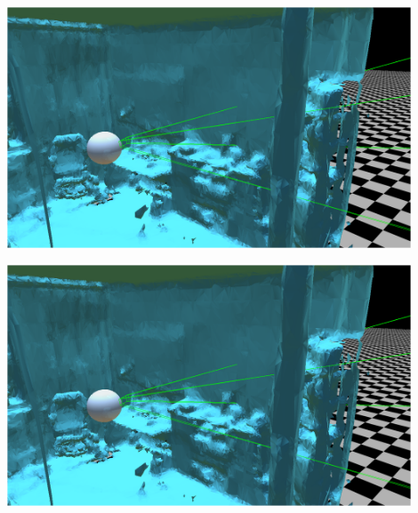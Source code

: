 \begin{minipage}{0.48\textwidth}
	\centering
	\includegraphics[width=0.9\textwidth]{images/Spatial_Understanding.png}
	\label{img:spatial-mapping}
\end{minipage}\begin{minipage}{0.48\textwidth}
	\centering
	\includegraphics[width=0.9\textwidth]{images/Spatial_Understanding.png}
\end{minipage}\\

